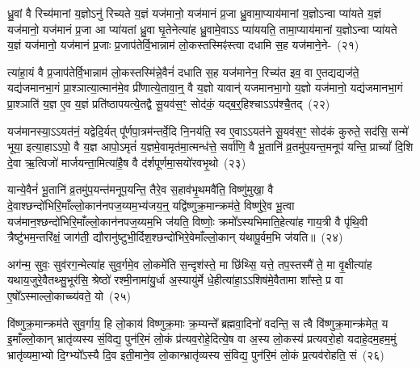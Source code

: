 {\anuvakamend[{द॒र्॒\mbox{}श॒पू॒र्ण॒मा॒सयो॑रुभ॒यतो॑ देवा॒श्वाः सु॒रेताः᳚ प्र॒जा\-प॑तिर्मिथु॒नेना᳚\-ऽऽ\-प्नोत्य॒ष्टौ च॑}]}

ध्रु॒वां वै रिच्य॑मानां य॒ज्ञो\-ऽनु॑ रिच्यते य॒ज्ञं यज॑मानो॒ यज॑मानं प्र॒जा ध्रु॒वामा॒प्याय॑मानां य॒ज्ञो\-ऽन्वा प्या॑यते य॒ज्ञं यज॑मानो॒ यज॑मानं प्र॒जा आ प्या॑यतां ध्रु॒वा घृ॒तेनेत्या॑ह ध्रु॒वामे॒वा\-ऽऽ प्या॑ययति॒ तामा॒प्याय॑मानां य॒ज्ञो\-ऽन्वा प्या॑यते य॒ज्ञं यज॑मानो॒ यज॑मानं प्र॒जाः प्र॒जा\-प॑तेर्वि॒भान्नाम॑ लो॒कस्तस्मिꣴ॑स्त्वा दधामि स॒ह यज॑माने॒ने-~(२१)\ip

त्या॑हा॒यं वै प्र॒जा\-प॑तेर्वि॒भान्नाम॑ लो॒कस्तस्मि॑न्ने॒वैनं॑ दधाति स॒ह यज॑मानेन॒ रिच्य॑त इव॒ वा ए॒तद्यद्यज॑ते॒ यद्य॑जमानभा॒गं प्रा॒श्ञात्या॒त्मान॑मे॒व प्री॑णात्ये॒तावा॒न्॒ वै य॒ज्ञो यावान्॑ यजमानभा॒गो य॒ज्ञो यज॑मानो॒ यद्य॑जमानभा॒गं प्रा॒श्ञाति॑ य॒ज्ञ ए॒व य॒ज्ञं प्रति॑ष्ठापयत्ये॒तद्वै सू॒यव॑स॒ꣳ॒ सोद॑कं॒ यद्ब॒र्॒\mbox{}हिश्चा\-ऽऽ\-प॑श्चै॒तद्~(२२)\ip

यज॑मानस्या॒\-ऽऽ\-यत॑नं॒ यद्वेदि॒र्यत् पू᳚र्णपा॒त्रम॑न्तर्वे॒दि नि॒नय॑ति॒ स्व ए॒वा\-ऽऽ\-यत॑ने सू॒यव॑स॒ꣳ॒ सोद॑कं कुरुते॒ सद॑सि॒ सन्मे॑ भूया॒ इत्या॒हा\-ऽऽ\-पो॒ वै य॒ज्ञ आपो॒\-ऽमृतं॑ य॒ज्ञमे॒वामृत॑मा॒त्मन्ध॑त्ते॒ सर्वा॑णि॒ वै भू॒तानि॑ व्र॒तमु॑प॒यन्त॒मनूप॑ यन्ति॒ प्राच्यां᳚ दि॒शि दे॒वा ऋ॒त्विजो॑ मार्जयन्ता॒मित्या॑है॒ष वै द॑र्\mbox{}शपूर्णमा॒सयो॑रवभृ॒थो~(२३)\ip

यान्ये॒वैनं॑ भू॒तानि॑ व्र॒तमु॑प॒यन्त॑मनूप॒यन्ति॒ तैरे॒व स॒हाव॑भृ॒थमवै॑ति॒ विष्णु॑मुखा॒ वै दे॒वाश्छन्दो॑भिरि॒माँल्लो॒कान॑नप\-ज॒य्यम॒भ्य॑जय॒न्॒ यद्वि॑ष्णुक्र॒मान्क्रम॑ते॒ विष्णु॑रे॒व भू॒त्वा यज॑मान॒श्छन्दो॑भि\-रि॒माँल्लो॒का\-न॑नप\-ज॒य्य\-म॒भि ज॑यति॒ विष्णोः॒ क्रमो᳚\-ऽस्यभिमाति॒हेत्या॑ह गाय॒त्री वै पृ॑थि॒वी त्रैष्टु॑भम॒न्तरि॑क्षं॒ जाग॑ती॒ द्यौरानु॑ष्टुभी॒र्दिश॒श्छन्दो॑\-भिरे॒वेमाँल्लो॒कान् य॑थापू॒र्वम॒भि ज॑यति॥~(२४)\ip

{\anuvakamend[{इत्ये॒तद॑वभृ॒थो दिशः॑ स॒प्त च॑}]}

अग॑न्म॒ सुवः॒ सुव॑रग॒न्मेत्या॑ह सुव॒र्गमे॒व लो॒कमे॑ति स॒न्दृश॑स्ते॒ मा छि॑थ्सि॒ यत्ते॒ तप॒स्तस्मै॑ ते॒ मा वृ॒क्षीत्या॑ह यथाय॒जुरे॒वैतथ्सु॒भूर॑सि॒ श्रेष्ठो॑ रश्मी॒नामा॑यु॒र्धा अ॒स्यायु॑र्मे धे॒हीत्या॑हा॒\-ऽऽ\-शिष॑मे॒वैतामा शा᳚स्ते॒ प्र वा ए॒षो᳚\-ऽस्माल्लो॒काच्च्य॑वते॒ यो~(२५)\ip

वि॑ष्णुक्र॒मान्क्रम॑ते सुव॒र्गाय॒ हि लो॒काय॑ विष्णुक्र॒माः क्र॒म्यन्ते᳚ ब्रह्मवा॒दिनो॑ वदन्ति॒ स त्वै वि॑ष्णुक्र॒मान्क्र॑मेत॒ य इ॒माँल्लो॒कान् भ्रातृ॑व्यस्य सं॒विद्य॒ पुन॑रि॒मं लो॒कं प्र॑त्यव॒रोहे॒दित्ये॒ष वा अ॒स्य लो॒कस्य॑ प्रत्यवरो॒हो यदाहे॒दम॒हम॒मुं भ्रातृ॑व्यमा॒भ्यो दि॒ग्भ्यो᳚\-ऽस्यै दि॒व इती॒माने॒व लो॒कान्भ्रातृ॑व्यस्य सं॒विद्य॒ पुन॑रि॒मं लो॒कं प्र॒त्यव॑रोहति॒ सं~(२६)\ip

